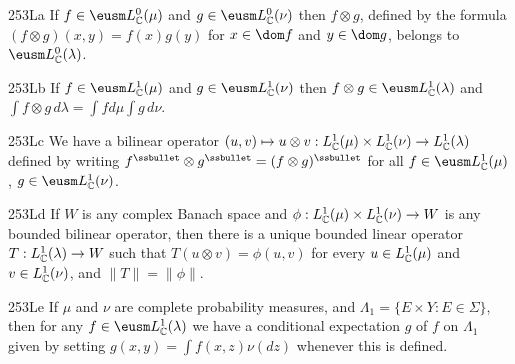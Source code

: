 \spheader 253La If $f\in\eusm L^0_{\Bbb C}(\mu)$ and
$g\in\eusm L^0_{\Bbb C}(\nu)$ then $f\otimes g$, defined by the formula
$(f\otimes g)(x,y)=f(x)g(y)$ for $x\in\dom f$ and $y\in\dom g$, belongs
to $\eusm L^0_{\Bbb C}(\lambda)$.

\spheader 253Lb If $f\in\eusm L^1_{\Bbb C}(\mu)$ and
$g\in\eusm L^1_{\Bbb C}(\nu)$ then
$f\otimes g\in\eusm L^1_{\Bbb C}(\lambda)$ and
$\int f\otimes g\,d\lambda=\int fd\mu\int g\,d\nu$.

\spheader 253Lc We have a bilinear operator $(u,v)\mapsto u\otimes v:
L^1_{\Bbb C}(\mu)\times L^1_{\Bbb C}(\nu)\to L^1_{\Bbb C}(\lambda)$
defined by writing $f^{\ssbullet}\otimes g^{\ssbullet}=(f\otimes
g)^{\ssbullet}$ for all $f\in\eusm L^1_{\Bbb C}(\mu)$, $g\in \eusm
L^1_{\Bbb C}(\nu)$.

\spheader 253Ld If $W$ is any complex Banach space and
$\phi:L^1_{\Bbb C}(\mu)\times L^1_{\Bbb C}(\nu)\to W$ is any bounded
bilinear operator, then there is a unique bounded linear operator
$T:L^1_{\Bbb C}(\lambda)\to W$ such that $T(u\otimes v)=\phi(u,v)$ for
every $u\in L^1_{\Bbb C}(\mu)$ and $v\in L^1_{\Bbb C}(\nu)$, and
$\|T\|=\|\phi\|$.

\spheader 253Le If $\mu$ and $\nu$ are complete probability measures,
and $\Lambda_1=\{E\times Y:E\in\Sigma\}$, then for any $f\in\eusm
L^1_{\Bbb C}(\lambda)$ we have a conditional expectation $g$ of $f$ on
$\Lambda_1$ given by setting $g(x,y)=\int f(x,z)\nu(dz)$ whenever this
is defined.


